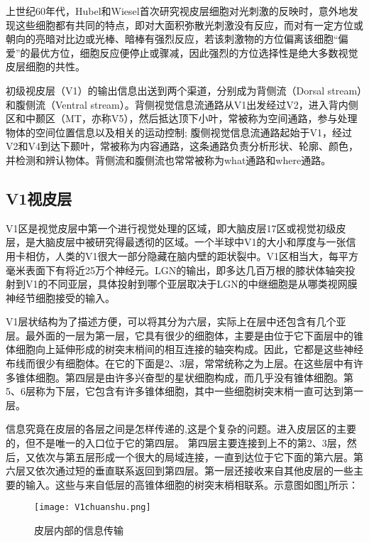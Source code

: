 \documentclass[a4paper,12pt]{article}
\begin{document}
上世纪60年代，Hubel和Wiesel首次研究视皮层细胞对光刺激的反映时，意外地发现\cite{16:book}这些细胞都有共同的特点，即对大面积弥散光刺激没有反应，而对有一定方位或朝向的亮暗对比边或光棒、暗棒有强烈反应，若该刺激物的方位偏离该细胞“偏爱”的最优方位，细胞反应便停止或骤减，因此强烈的方位选择性是绝大多数视觉皮层细胞的共性。


初级视皮层（V1）的输出信息出送到两个渠道\cite{6:article}，分别成为背侧流（Dorsal stream）和腹侧流（Ventral stream）。背侧视觉信息流通路从V1出发经过V2，进入背内侧区和中颞区（MT，亦称V5），然后抵达顶下小叶，常被称为空间通路，参与处理物体的空间位置信息以及相关的运动控制; 腹侧视觉信息流通路起始于V1，经过V2和V4到达下颞叶，常被称为内容通路，这条通路负责分析形状、轮廓、颜色，并检测和辨认物体。背侧流和腹侧流也常常被称为what通路和where通路\cite{15:book}。


\subsection{V1视皮层}


V1区\cite{16:book}是视觉皮层中第一个进行视觉处理的区域，即大脑皮层17区或视觉初级皮层，是大脑皮层中被研究得最透彻的区域。一个半球中V1的大小和厚度与一张信用卡相仿，人类的V1很大一部分隐藏在脑内壁的距状裂中。V1区相当大，每平方毫米表面下有将近25万个神经元\cite{8:article}。LGN的输出，即多达几百万根的膝状体轴突投射到V1的不同亚层，具体投射到哪个亚层取决于LGN的中继细胞是从哪类视网膜神经节细胞接受的输入。


V1层状结构为了描述方便，可以将其分为六层\cite{15:book}，实际上在层中还包含有几个亚层。最外面的一层为第一层，它具有很少的细胞体，主要是由位于它下面层中的锥体细胞向上延伸形成的树突末梢间的相互连接的轴突构成。因此，它都是这些神经布线而很少有细胞体。在它的下面是2、3层，常常统称之为上层。在这些层中有许多锥体细胞。第四层是由许多兴奋型的星状细胞构成，而几乎没有锥体细胞。第5、6层称为下层，它包含有许多锥体细胞，其中一些细胞树突末梢一直可达到第一层。


信息究竟在皮层的各层之间是怎样传递的,这是个复杂的问题。进入皮层区的主要的，但不是唯一的入口位于它的第四层\cite{16:book}。 第四层主要连接到上不的第2、3层，然后，又依次与第五层形成一个很大的局域连接，一直到达位于它下面的第六层。第六层又依次通过短的垂直联系返回到第四层。第一层还接收来自其他皮层的一些主要的输入。这些与来自低层的高锥体细胞的树突末梢相联系。示意图如图\ref{fig 9}所示：


\begin{figure}[!htb]
\centering
\texttt{[image: V1chuanshu.png]}
\caption{皮层内部的信息传输}\label{fig 9} 
\end{figure}
\end{document}
